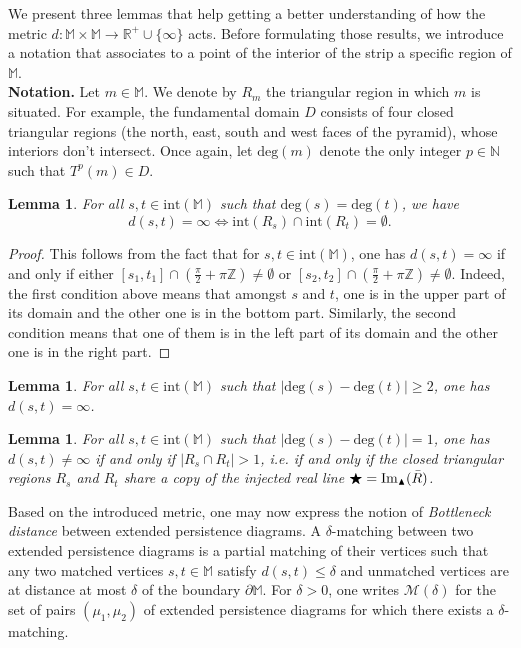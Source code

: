 \documentclass[11pt]{article}
\newtheorem{lemma}[theorem]{Lemma}
\theoremstyle{remark}
\newcommand{\Z}{\mathbb{Z}}
\newcommand{\N}{\mathbb{N}}
\newcommand{\R}{\mathbb{R}}
\newcommand{\M}{\mathbb{M}}
\begin{document}
\noindent We present three lemmas that help getting a better understanding of how the metric $d:\M\times\M\rightarrow\R^+\cup\{\infty\}$ acts. Before formulating those results, we introduce a notation that associates to a point of the interior of the strip a specific region of $\M$.\\

\noindent \textbf{Notation.} Let $m\in\M$. We denote by $R_m$ the triangular region in which $m$ is situated. For example, the fundamental domain $D$ consists of four closed triangular regions (the north, east, south and west faces of the pyramid), whose interiors don't intersect. Once again, let $\mathrm{deg}(m)$ denote the only integer $p\in\N$ such that $T^p(m)\in D$.

\begin{lemma}
For all $s,t\in\mathrm{int}(\M)$ such that $\mathrm{deg}(s)=\mathrm{deg}(t)$, we have $$d(s,t)=\infty\iff \mathrm{int}(R_s)\cap \mathrm{int}(R_t)=\emptyset.$$
\end{lemma}

\begin{proof}
This follows from the fact that for $s,t\in\mathrm{int}(\M)$, one has $d(s,t)=\infty$ if and only if either $[s_1,t_1]\cap (\frac{\pi}{2}+\pi\Z)\neq \emptyset$ or $[s_2,t_2]\cap (\frac{\pi}{2}+\pi\Z)\neq \emptyset$. Indeed, the first condition above means that amongst $s$ and $t$, one is in the upper part of its domain and the other one is in the bottom part. Similarly, the second condition means that one of them is in the left part of its domain and the other one is in the right part.
\end{proof}

\begin{lemma}
For all $s,t\in\mathrm{int}(\M)$ such that $|\mathrm{deg}(s)-\mathrm{deg}(t)|\geq 2$, one has $d(s,t)=\infty$.
\end{lemma}

\begin{lemma}
\label{cool_case}
For all $s,t\in\mathrm{int}(\M)$ such that $|\mathrm{deg}(s)- \mathrm{deg}(t)|=1$, one has $d(s,t)\neq\infty$ if and only if $|R_s\cap R_t|>1$, \textit{i.e.} if and only if the closed triangular regions $R_s$ and $R_t$ share a copy of the injected real line $\bigstar=\mathrm{Im}_\blacktriangle(\Bar{R})$.
\end{lemma}

\noindent Based on the introduced metric, one may now express the notion of \textit{Bottleneck distance} between extended persistence diagrams. A $\delta$-matching between two extended persistence diagrams is a partial matching of their vertices such that any two matched vertices $s,t\in\M$ satisfy $d(s,t)\leq\delta$ and unmatched vertices are at distance at most $\delta$ of the boundary $\partial\M$. For $\delta>0$, one writes $\mathcal{M}(\delta)$ for the set of pairs $(\mu_1,\mu_2)$ of extended persistence diagrams for which there exists a $\delta$-matching.
\end{document}
